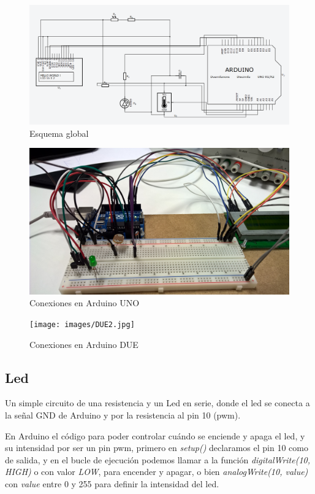 \documentclass[]{article}
\begin{document}
\begin{figure}[H]
	\centering
	\includegraphics[width=0.6\linewidth]{images/squema.PNG}
	\caption{Esquema global}
	\label{fig:squema}
\end{figure}


\begin{figure}[H]
	\centering
	\includegraphics[width=1\linewidth]{images/arduinoUNO.jpg}
	\caption{Conexiones en Arduino UNO}
	\label{fig:uno}
\end{figure}

\begin{figure}[H]
	\centering
	\texttt{[image: images/DUE2.jpg]}
	\caption{Conexiones en Arduino DUE}
	\label{fig:due}
\end{figure}

\subsection{Led}
Un simple circuito de una resistencia y un Led en serie, donde el led se conecta a la señal GND de Arduino y por la resistencia al pin 10 (pwm).

En Arduino el código para poder controlar cuándo se enciende y apaga el led, y su intensidad por ser un pin pwm, primero en \textit{setup()} declaramos el pin 10 como de salida, y en el bucle de ejecución podemos llamar a la función \textit{digitalWrite(10, HIGH)} o con valor \textit{LOW}, para encender y apagar, o bien \textit{analogWrite(10, value)} con \textit{value} entre 0 y 255 para definir la intensidad del led.
\end{document}
